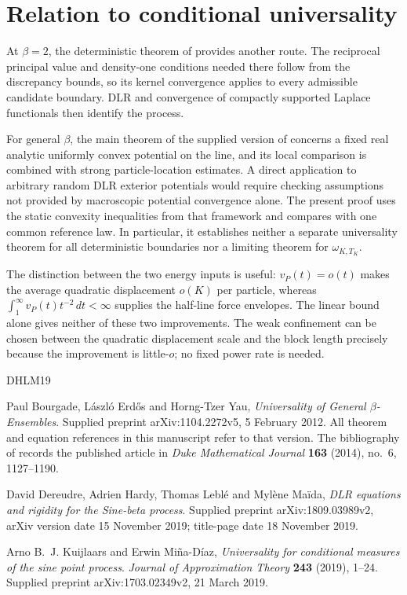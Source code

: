 \documentclass[11pt,reqno]{amsart}
\numberwithin{equation}{section}
\theoremstyle{definition}
\theoremstyle{remark}
\newcommand{\1}{\mathbf 1}
\newcommand{\dd}{\,d}
\begin{document}
\section{Relation to conditional universality}

At $\beta=2$, the deterministic theorem of \cite[Theorem~1.3]{KMD}
provides another route. The reciprocal principal value and density-one
conditions needed there follow from the discrepancy bounds, so its
kernel convergence applies to every admissible candidate boundary.
DLR and convergence of compactly supported Laplace functionals then
identify the process.

For general $\beta$, the main theorem of the supplied version of
\cite{BEY} concerns a fixed real analytic uniformly convex potential
on the line, and its local comparison is combined with strong
particle-location estimates. A direct application to arbitrary
random DLR exterior potentials would require checking assumptions not
provided by macroscopic potential convergence alone.
The present proof uses the static convexity inequalities from that
framework and compares with one common reference law. In particular,
it establishes neither a separate universality theorem for all
deterministic boundaries nor a limiting theorem for
$\omega_{K,T_K}$.

The distinction between the two energy inputs is useful:
$v_P(t)=o(t)$ makes the average quadratic displacement $o(K)$ per
particle, whereas $\int_1^\infty v_P(t)t^{-2}\dd t<\infty$ supplies
the half-line force envelopes. The linear bound alone gives neither
of these two improvements. The weak confinement can be chosen between
the quadratic displacement scale and the block length precisely
because the improvement is little-$o$; no fixed power rate is needed.

\begin{thebibliography}{DHLM19}

Paul Bourgade, L\'aszl\'o Erd\H{o}s and Horng-Tzer Yau,
\emph{Universality of General $\beta$-Ensembles}.
Supplied preprint arXiv:1104.2272v5, 5 February 2012.
All theorem and equation references in this manuscript refer to that
version. The bibliography of \cite{DHLM} records the published article
in \emph{Duke Mathematical Journal} \textbf{163} (2014), no.~6,
1127--1190.

David Dereudre, Adrien Hardy, Thomas Lebl\'e and Myl\`ene Ma\"ida,
\emph{DLR equations and rigidity for the Sine-beta process}.
Supplied preprint arXiv:1809.03989v2, arXiv version date
15 November 2019; title-page date 18 November 2019.

Arno B.~J. Kuijlaars and Erwin Mi\~na-D\'iaz,
\emph{Universality for conditional measures of the sine point process}.
\emph{Journal of Approximation Theory} \textbf{243} (2019), 1--24.
Supplied preprint arXiv:1703.02349v2, 21 March 2019.

\end{thebibliography}
\end{document}
